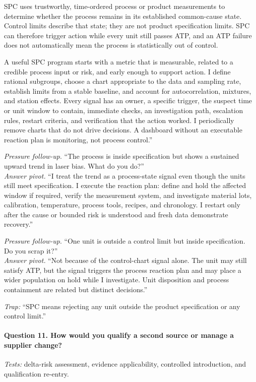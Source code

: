 SPC uses trustworthy, time-ordered process or product measurements to determine
whether the process remains in its established common-cause state. Control
limits describe that state; they are not product specification limits. SPC can
therefore trigger action while every unit still passes ATP, and an ATP failure
does not automatically mean the process is statistically out of control.

A useful SPC program starts with a metric that is measurable, related to a
credible process input or risk, and early enough to support action. I define
rational subgroups, choose a chart appropriate to the data and sampling rate,
establish limits from a stable baseline, and account for autocorrelation,
mixtures, and station effects. Every signal has an owner, a specific trigger,
the suspect time or unit window to contain, immediate checks, an investigation
path, escalation rules, restart criteria, and verification that the action
worked. I periodically remove charts that do not drive decisions. A dashboard
without an executable reaction plan is monitoring, not process control.''

\textit{Pressure follow-up.} ``The process is inside specification but shows a
sustained upward trend in laser bias. What do you do?''\\
\textit{Answer pivot.} ``I treat the trend as a process-state signal even
though the units still meet specification. I execute the reaction plan: define
and hold the affected window if required, verify the measurement system, and
investigate material lots, calibration, temperature, process tools, recipes,
and chronology. I restart only after the cause or bounded risk is understood and
fresh data demonstrate recovery.''

\textit{Pressure follow-up.} ``One unit is outside a control limit but inside
specification. Do you scrap it?''\\
\textit{Answer pivot.} ``Not because of the control-chart signal alone. The
unit may still satisfy ATP, but the signal triggers the process reaction plan
and may place a wider population on hold while I investigate. Unit disposition
and process containment are related but distinct decisions.''

\textit{Trap:} ``SPC means rejecting any unit outside the product specification
or any control limit.''

\paragraph{Question 11. How would you qualify a second source or manage a
supplier change?}
\textit{Tests:} delta-risk assessment, evidence applicability, controlled
introduction, and qualification re-entry.


